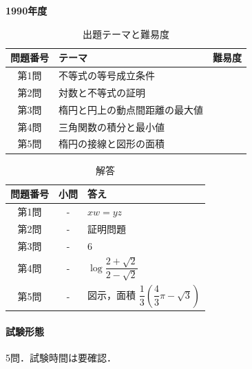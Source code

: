 \documentclass[../../main.tex]{subfiles}
\begin{document}
\begin{center}
  {\fontsize{48pt}{58pt}\selectfont \textbf{1990}\normalsize\textbf{年度}}
\end{center}

\begin{table}[htb]
  \centering
  \caption{出題テーマと難易度}
  \begin{tabular}{|c|p{9cm}|c|}
    \hline
    \textbf{問題番号} & \textbf{テーマ} & \textbf{難易度} \\
    \hline
    第1問 & 不等式の等号成立条件 & \\
    \hline
    第2問 & 対数と不等式の証明 & \\
    \hline
    第3問 & 楕円と円上の動点間距離の最大値 & \\
    \hline
    第4問 & 三角関数の積分と最小値 & \\
    \hline
    第5問 & 楕円の接線と図形の面積 & \\
    \hline
  \end{tabular}
\end{table}

\begin{table}[htb]
  \centering
  \caption{解答}
  \renewcommand{\arraystretch}{1.4}
  \begin{tabular}{|c|c|p{9cm}|}
    \hline
    \textbf{問題番号} & \textbf{小問} & \textbf{答え} \\
    \hline
    第1問 & - & $xw=yz$ \\
    \hline
    第2問 & - & 証明問題 \\
    \hline
    第3問 & - & $6$ \\
    \hline
    第4問 & - & $\log\dfrac{2+\sqrt{2}}{2-\sqrt{2}}$ \\
    \hline
    第5問 & - & 図示，面積 $\dfrac{1}{3}\left(\dfrac{4}{3}\pi-\sqrt{3}\right)$ \\
    \hline
  \end{tabular}
\end{table}

\paragraph{試験形態}
5問．試験時間は要確認．
\end{document}
